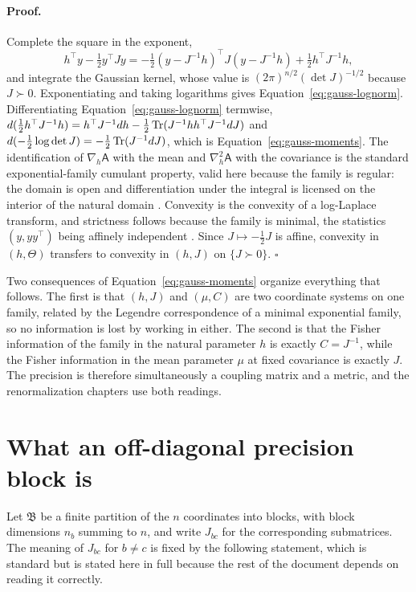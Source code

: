 \paragraph{Proof.}
Complete the square in the exponent,
\begin{equation}
h^\top y-\tfrac12 y^\top Jy
=-\tfrac12\left(y-J^{-1}h\right)^\top J\left(y-J^{-1}h\right)+\tfrac12 h^\top J^{-1}h,
\label{eq:gauss-complete-square}
\end{equation}
and integrate the Gaussian kernel, whose value is $(2\pi)^{n/2}(\det J)^{-1/2}$ because $J\succ0$. Exponentiating and taking logarithms gives Equation~\eqref{eq:gauss-lognorm}. Differentiating Equation~\eqref{eq:gauss-lognorm} termwise, $d(\tfrac12h^\top J^{-1}h)=h^\top J^{-1}dh-\tfrac12\operatorname{Tr}(J^{-1}hh^\top J^{-1}dJ)$ and $d(-\tfrac12\log\det J)=-\tfrac12\operatorname{Tr}(J^{-1}dJ)$, which is Equation~\eqref{eq:gauss-moments}. The identification of $\nabla_h\mathsf A$ with the mean and $\nabla_h^2\mathsf A$ with the covariance is the standard exponential-family cumulant property, valid here because the family is regular: the domain is open and differentiation under the integral is licensed on the interior of the natural domain \citep{Brown1986}. Convexity is the convexity of a log-Laplace transform, and strictness follows because the family is minimal, the statistics $(y,yy^\top)$ being affinely independent \citep{Brown1986,Wainwright2008}. Since $J\mapsto-\tfrac12J$ is affine, convexity in $(h,\Theta)$ transfers to convexity in $(h,J)$ on $\{J\succ0\}$. $\square$

Two consequences of Equation~\eqref{eq:gauss-moments} organize everything that follows. The first is that $(h,J)$ and $(\mu,C)$ are two coordinate systems on one family, related by the Legendre correspondence of a minimal exponential family, so no information is lost by working in either. The second is that the Fisher information of the family in the natural parameter $h$ is exactly $C=J^{-1}$, while the Fisher information in the mean parameter $\mu$ at fixed covariance is exactly $J$. The precision is therefore simultaneously a coupling matrix and a metric, and the renormalization chapters use both readings.

\section{What an off-diagonal precision block is}
\label{sec:gauss-conditional-reading}

Let $\mathfrak B$ be a finite partition of the $n$ coordinates into blocks, with block dimensions $n_b$ summing to $n$, and write $J_{bc}$ for the corresponding submatrices. The meaning of $J_{bc}$ for $b\neq c$ is fixed by the following statement, which is standard but is stated here in full because the rest of the document depends on reading it correctly.

